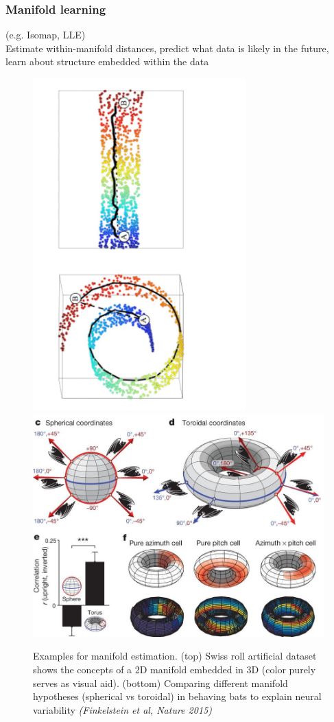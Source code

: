 \documentclass[11pt]{article}
\begin{document}
 \clearpage
 
\subsubsection{Manifold learning} 
(e.g. Isomap, LLE) \\ Estimate within-manifold distances, predict what data is likely in the future, learn about structure embedded within the data
 

\begin{figure}[h!]
\centering
\includegraphics[angle=-90,origin=c, height=0.7\linewidth, width=0.73\textwidth]{swiss-unroll-distance}
\\ \vspace{-3cm}
\includegraphics[width=0.5\linewidth]{bat_neurons_nature14031-f3} 
\caption{Examples for manifold estimation. (top) Swiss roll artificial dataset shows the concepts of a 2D manifold embedded in 3D (color purely serves as visual aid). (bottom) Comparing different manifold hypotheses (spherical vs toroidal) in behaving bats to explain neural variability \emph{(Finkelstein et al, Nature 2015)}}
\end{figure} 
\end{document}
